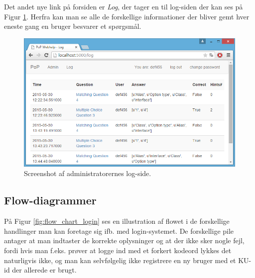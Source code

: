 \documentclass[11pt, a4paper]{article}
\begin{document}
Det andet nye link på forsiden er \emph{Log}, der tager en til log-siden der kan ses på Figur \ref{fig:screenshot_admin_log}. Herfra kan man se alle de forskellige informationer der bliver gemt hver eneste gang en bruger besvarer et spørgsmål.

\begin{figure}[htpb]
    \centering
    \includegraphics[width=1\linewidth]{figures/interface/admin_log.png}
    \caption{Screenshot af administratorernes log-side.}
    \label{fig:screenshot_admin_log}
\end{figure}

\FloatBarrier

\subsection{Flow-diagrammer}
\label{sub:flow_charts}
På Figur \ref{fig:flow_chart_login} ses en illustration af flowet i de forskellige handlinger man kan foretage sig ifb. med login-systemet. De forskellige pile antager at man indtaster de korrekte oplysninger og at der ikke sker nogle fejl, fordi hvis man f.eks. prøver at logge ind med et forkert kodeord lykkes det naturligvis ikke, og man kan selvfølgelig ikke registrere en ny bruger med et KU-id der allerede er brugt.
\end{document}
